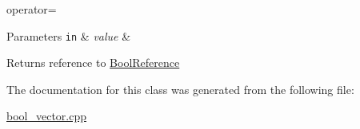 operator= 


\begin{DoxyParams}[1]{Parameters}
\mbox{\tt in}  & {\em value} & \\
\hline
\end{DoxyParams}
\begin{DoxyReturn}{Returns}
reference to \hyperlink{classVector_3_01bool_01_4_1_1BoolReference}{Bool\+Reference} 
\end{DoxyReturn}


The documentation for this class was generated from the following file\+:\begin{DoxyCompactItemize}
\item 
\hyperlink{bool__vector_8cpp}{bool\+\_\+vector.\+cpp}\end{DoxyCompactItemize}
